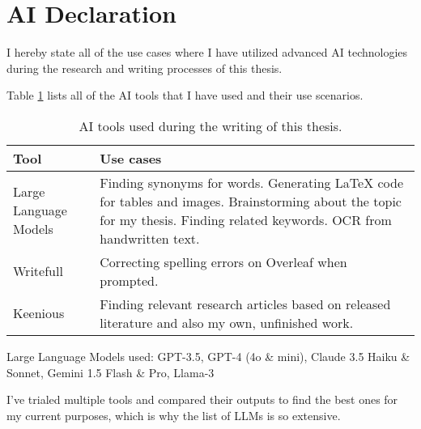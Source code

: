 



\chapter*{AI Declaration\label{extra:declaration}}

I hereby state all of the use cases where I have utilized advanced AI technologies during the research and writing processes of this thesis.

Table \ref{table:declaration} lists all of the AI tools that I have used and their use scenarios.

\begin{table}[h]
  \centering
  \begin{tabularx}{\textwidth}{>{\hsize=0.3\hsize}X >{\hsize=0.7\hsize}X}  
    \hline
    \textbf{Tool} & \textbf{Use cases} \\
    \hline
    Large Language Models & Finding synonyms for words. Generating LaTeX code for tables and images. Brainstorming about the topic for my thesis. Finding related keywords. OCR from handwritten text.\\
    \hline
    Writefull& Correcting spelling errors on Overleaf when prompted. \\
    \hline
    Keenious & Finding relevant research articles based on released literature and also my own, unfinished work. \\
    \hline
  \end{tabularx}
  \caption{AI tools used during the writing of this thesis.}
  \label{table:declaration}
\end{table}

Large Language Models used: GPT-3.5, GPT-4 (4o \& mini), Claude 3.5 Haiku \& Sonnet, Gemini 1.5 Flash \& Pro, Llama-3

I've trialed multiple tools and compared their outputs to find the best ones for my current purposes, which is why the list of LLMs is so extensive.